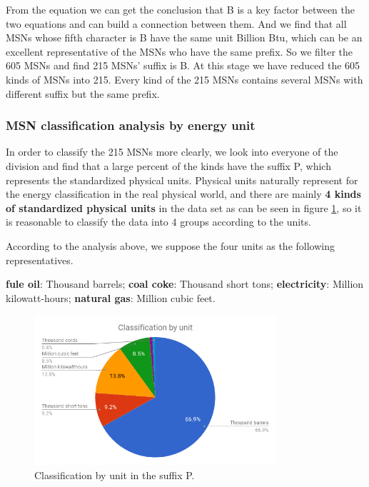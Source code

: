 \documentclass[a4paper,11pt]{article}
\begin{document}
\par From the equation we can get the conclusion that B is a key factor between the two equations and can build a connection between them. And we find that all MSNs whose fifth character is B have the same unit Billion Btu, which can be an excellent representative of the MSNs who have the same prefix. So we filter the 605 MSNs and find 215 MSNs' suffix is B. At this stage we have reduced the 605 kinds of MSNs into 215. Every kind of the 215 MSNs contains several MSNs with different suffix but the same prefix.


\subsubsection {MSN classification analysis by energy unit}



\par In order to classify the 215 MSNs more clearly, we look into everyone of the division and find that a large percent of the kinds have the suffix P, which represents the standardized physical units. Physical units naturally represent for the energy classification in the real physical world, and there are mainly \textbf{4 kinds of standardized physical units} in the data set as can be seen in figure \ref{fig:classification_by_unit}, so it is reasonable to classify the data into 4 groups according to the units.
\par According to the analysis above, we suppose the four units as the following representatives.
\par \textbf{fule oil}: Thousand barrels;
\textbf{coal coke}: Thousand short tons;
\textbf{electricity}: Million kilowatt-hours;
\textbf{natural gas}: Million cubic feet.

\begin{figure}[!h]%
    \centering 
    \includegraphics[width=0.8\textwidth]{./Pic/classification_by_unit.png}
    \caption{Classification by unit in the suffix P.}
    \label{fig:classification_by_unit}  
\end{figure}
\end{document}
